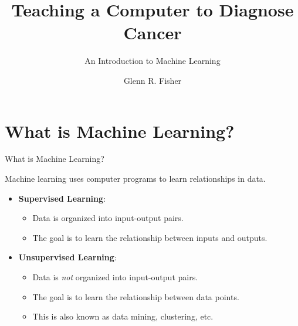 \documentclass[8pt,aspectratio=169]{beamer}
\title{Teaching a Computer to Diagnose Cancer}
\subtitle{An Introduction to Machine Learning}
\author{Glenn R. Fisher}
\institute[IBM Mobile Innovation Lab] %
\begin{document}
\begin{frame}
  \titlepage
\end{frame}



\section{What is Machine Learning?}


\begin{frame}{What is Machine Learning?}

\pause
Machine learning uses computer programs to learn relationships in data.
\newline

\begin{itemize}
\item \pause
  \textbf{Supervised Learning}:
    \begin{itemize}
    \item \pause Data is organized into input-output pairs.
    \item \pause The goal is to learn the relationship between inputs and outputs.
    \end{itemize}
\vspace{3mm}
\item \pause
  \textbf{Unsupervised Learning}:
    \begin{itemize}
    \item \pause Data is \textit{not} organized into input-output pairs.
    \item \pause The goal is to learn the relationship between data points.
    \item \pause This is also known as data mining, clustering, etc.
    \end{itemize}
\end{itemize}

\end{frame}

\end{document}
